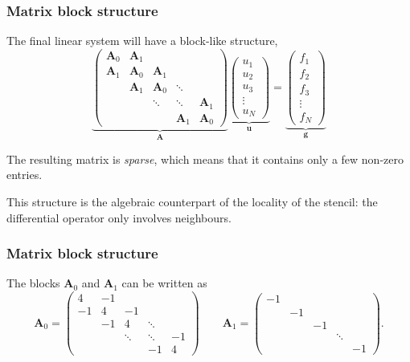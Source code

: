 \begin{frame}
  \frametitle{Matrix block structure}
  The final linear system will have a block-like structure,
  \[
    \underbrace{
      \begin{pmatrix}
        \bm A_0 & \bm A_1 & & & \\
        \bm A_1 & \bm A_0 & \bm A_1 & & \\
        & \bm A_1 & \bm A_0 & \ddots & \\
        & & \ddots & \ddots & \bm A_1 \\
        & & & \bm A_1 & \bm A_0
      \end{pmatrix}}_{\bm A}
    \underbrace{
      \begin{pmatrix}
        u_1 \\ u_2 \\ u_3 \\ \vdots \\ u_N
      \end{pmatrix}}_{\bm u}
    =
    \underbrace{
      \begin{pmatrix}
        f_1 \\ f_2 \\ f_3 \\ \vdots \\ f_N
      \end{pmatrix}}_{\bm g}
  \]

\medskip
The resulting matrix is \textit{sparse}, which means that it contains only a few non-zero entries.

\medskip
This structure is the algebraic counterpart of the locality of the stencil: the differential operator only involves neighbours.
\end{frame}

\begin{frame}
  \frametitle{Matrix block structure}
  The blocks $\bm A_0$ and $\bm A_1$ can be written as
  \[
    \bm A_0 =
    \begin{pmatrix}
      4 & -1 & & & \\
      -1 & 4 & -1 & & \\
      & -1 & 4 & \ddots & \\
      & & \ddots & \ddots & -1 \\
      & & & -1 & 4
    \end{pmatrix}
    \qquad
    \bm A_1 =
    \begin{pmatrix}
      -1 & & & & \\
      & -1 & & & \\
      & & -1 & & \\
      & & & \ddots & \\
      & & & & -1
    \end{pmatrix}.
  \]
\end{frame}

